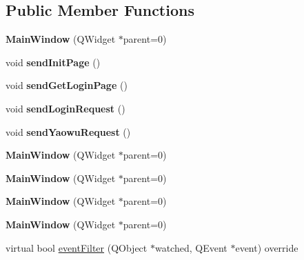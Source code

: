 \subsection*{Public Member Functions}
\begin{DoxyCompactItemize}
\item 
\mbox{\label{class_main_window_a8b244be8b7b7db1b08de2a2acb9409db}} 
{\bfseries Main\+Window} (Q\+Widget $\ast$parent=0)
\item 
\mbox{\label{class_main_window_ad9e82620346bca2f1afc951f2c796482}} 
void {\bfseries send\+Init\+Page} ()
\item 
\mbox{\label{class_main_window_afb543ba5ba78fab324c91cdae3117ce0}} 
void {\bfseries send\+Get\+Login\+Page} ()
\item 
\mbox{\label{class_main_window_a77048c9b38089efb89f7f6e84b19a584}} 
void {\bfseries send\+Login\+Request} ()
\item 
\mbox{\label{class_main_window_af1dc8502f5c4c897adeed938ae02cb05}} 
void {\bfseries send\+Yaowu\+Request} ()
\item 
\mbox{\label{class_main_window_a8b244be8b7b7db1b08de2a2acb9409db}} 
{\bfseries Main\+Window} (Q\+Widget $\ast$parent=0)
\item 
\mbox{\label{class_main_window_a8b244be8b7b7db1b08de2a2acb9409db}} 
{\bfseries Main\+Window} (Q\+Widget $\ast$parent=0)
\item 
\mbox{\label{class_main_window_a8b244be8b7b7db1b08de2a2acb9409db}} 
{\bfseries Main\+Window} (Q\+Widget $\ast$parent=0)
\item 
\mbox{\label{class_main_window_a8b244be8b7b7db1b08de2a2acb9409db}} 
{\bfseries Main\+Window} (Q\+Widget $\ast$parent=0)
\item 
virtual bool \mbox{\hyperlink{class_main_window_ade305265b2120df2489a5ebeb07ebbe1}{event\+Filter}} (Q\+Object $\ast$watched, Q\+Event $\ast$event) override
\item 
\mbox{\label{class_main_window_a8b244be8b7b7db1b08de2a2acb9409db}} 

\end{DoxyCompactItemize}
